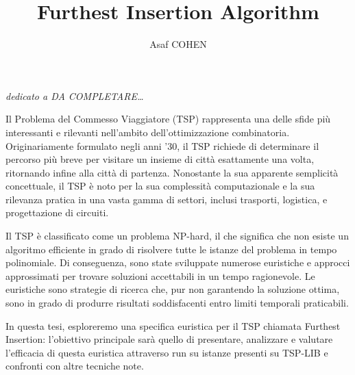 \documentclass[a4paper,12pt]{report}
\begin{document}
\title{Furthest Insertion Algorithm}
\author{Asaf COHEN}
%
% 
%

\beforepreface

\clearpage
\null
\thispagestyle{empty}
\clearpage

        {\hfill \Large {\sl dedicato a DA COMPLETARE\dots}}
% 
%

\clearpage
\null
\thispagestyle{empty}
\clearpage

Il Problema del Commesso Viaggiatore (TSP) rappresenta una delle sfide più interessanti e rilevanti nell'ambito dell'ottimizzazione combinatoria. Originariamente formulato negli anni '30, il TSP richiede di determinare il percorso più breve per visitare un insieme di città esattamente una volta, ritornando infine alla città di partenza. Nonostante la sua apparente semplicità concettuale, il TSP è noto per la sua complessità computazionale e la sua rilevanza pratica in una vasta gamma di settori, inclusi trasporti,  logistica, e progettazione di circuiti.

Il TSP è classificato come un problema NP-hard, il che significa che non esiste un algoritmo efficiente in grado di risolvere tutte le istanze del problema in tempo polinomiale. Di conseguenza, sono state sviluppate numerose euristiche e approcci approssimati per trovare soluzioni accettabili in un tempo ragionevole. Le euristiche sono strategie di ricerca che, pur non garantendo la soluzione ottima, sono in grado di produrre risultati soddisfacenti entro limiti temporali praticabili.

In questa tesi, esploreremo una specifica euristica per il TSP chiamata Furthest Insertion: l'obiettivo principale sarà quello di presentare, analizzare e valutare l'efficacia di questa euristica attraverso run su istanze presenti su TSP-LIB e confronti con altre tecniche note.
\end{document}
